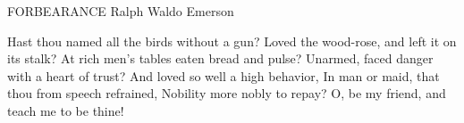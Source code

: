 FORBEARANCE
Ralph Waldo Emerson

Hast thou named all the birds without a gun?
Loved the wood-rose, and left it on its stalk?
At rich men's tables eaten bread and pulse?
Unarmed, faced danger with a heart of trust?
And loved so well a high behavior,
In man or maid, that thou from speech refrained,
Nobility more nobly to repay?
O, be my friend, and teach me to be thine!

